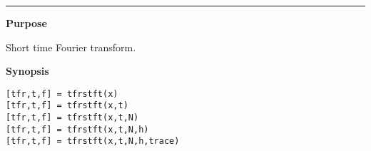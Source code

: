

\hspace*{-1.6cm}{\Large \bf tfrstft}

\vspace*{-.4cm}
\hspace*{-1.6cm}\rule[0in]{16.5cm}{.02cm}
\vspace*{.2cm}

{\bf \large {}\selectfont Purpose}\\
\hspace*{1.5cm}
\begin{minipage}[t]{13.5cm}
Short time Fourier transform.
\end{minipage}
\vspace*{.5cm}

{\bf \large {}\selectfont Synopsis}\\
\hspace*{1.5cm}
\begin{minipage}[t]{13.5cm}
\begin{verbatim}
[tfr,t,f] = tfrstft(x)
[tfr,t,f] = tfrstft(x,t)
[tfr,t,f] = tfrstft(x,t,N)
[tfr,t,f] = tfrstft(x,t,N,h)
[tfr,t,f] = tfrstft(x,t,N,h,trace)
\end{verbatim}
\end{minipage}
\vspace*{.5cm}


